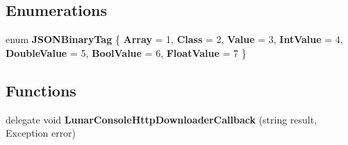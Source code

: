 \subsection*{Enumerations}
\begin{DoxyCompactItemize}
\item 
\mbox{\label{namespace_lunar_console_editor_internal_a1572a4f0dc264340b8135d2f6b3f1384}} 
enum {\bfseries J\+S\+O\+N\+Binary\+Tag} \{ \newline
{\bfseries Array} = 1, 
{\bfseries Class} = 2, 
{\bfseries Value} = 3, 
{\bfseries Int\+Value} = 4, 
\newline
{\bfseries Double\+Value} = 5, 
{\bfseries Bool\+Value} = 6, 
{\bfseries Float\+Value} = 7
 \}
\end{DoxyCompactItemize}
\subsection*{Functions}
\begin{DoxyCompactItemize}
\item 
\mbox{\label{namespace_lunar_console_editor_internal_a688a227f0a7692ae21325141e3709a35}} 
delegate void {\bfseries Lunar\+Console\+Http\+Downloader\+Callback} (string result, Exception error)
\end{DoxyCompactItemize}
